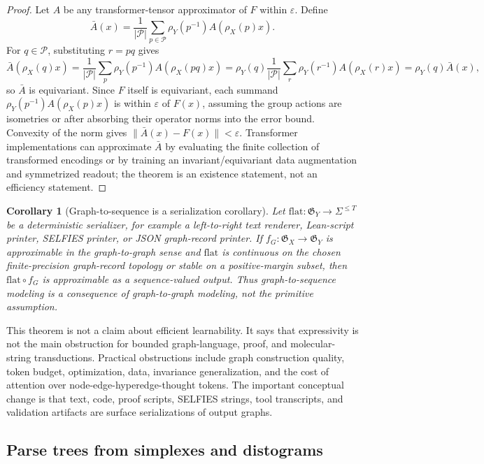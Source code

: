 \documentclass[11pt]{article}
\newtheorem{corollary}[definition]{Corollary}
\newcommand{\1}{\mathbf{1}}
\newcommand{\eps}{\varepsilon}
\begin{document}
\begin{proof}
Let \(A\) be any transformer-tensor approximator of \(F\) within \(\eps\). Define
\[
  \bar A(x)=\frac{1}{|\mathcal P|}\sum_{p\in\mathcal P}\rho_Y(p^{-1})A(\rho_X(p)x).
\]
For \(q\in\mathcal P\), substituting \(r=pq\) gives
\[
\bar A(\rho_X(q)x)
=\frac{1}{|\mathcal P|}\sum_p \rho_Y(p^{-1})A(\rho_X(pq)x)
=\rho_Y(q)\frac{1}{|\mathcal P|}\sum_r \rho_Y(r^{-1})A(\rho_X(r)x)
=\rho_Y(q)\bar A(x),
\]
so \(\bar A\) is equivariant. Since \(F\) itself is equivariant, each summand \(\rho_Y(p^{-1})A(\rho_X(p)x)\) is within \(\eps\) of \(F(x)\), assuming the group actions are isometries or after absorbing their operator norms into the error bound. Convexity of the norm gives \(\|\bar A(x)-F(x)\|<\eps\). Transformer implementations can approximate \(\bar A\) by evaluating the finite collection of transformed encodings or by training an invariant/equivariant data augmentation and symmetrized readout; the theorem is an existence statement, not an efficiency statement.
\end{proof}

\begin{corollary}[Graph-to-sequence is a serialization corollary]
Let \(\mathrm{flat}:\mathfrak G_Y\to\Sigma^{\le T}\) be a deterministic serializer, for example a left-to-right text renderer, Lean-script printer, SELFIES printer, or JSON graph-record printer. If \(f_G:\mathfrak G_X\to\mathfrak G_Y\) is approximable in the graph-to-graph sense and \(\mathrm{flat}\) is continuous on the chosen finite-precision graph-record topology or stable on a positive-margin subset, then \(\mathrm{flat}\circ f_G\) is approximable as a sequence-valued output. Thus graph-to-sequence modeling is a consequence of graph-to-graph modeling, not the primitive assumption.
\end{corollary}

This theorem is not a claim about efficient learnability. It says that expressivity is not the main obstruction for bounded graph-language, proof, and molecular-string transductions. Practical obstructions include graph construction quality, token budget, optimization, data, invariance generalization, and the cost of attention over node-edge-hyperedge-thought tokens. The important conceptual change is that text, code, proof scripts, SELFIES strings, tool transcripts, and validation artifacts are surface serializations of output graphs.

\subsection{Parse trees from simplexes and distograms}
\end{document}
